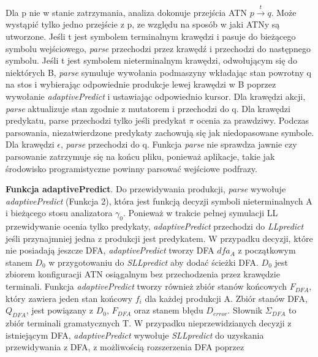 \par
Dla p nie w stanie zatrzymania, analiza dokonuje przejścia ATN $p\overset{t}{\rightarrow}q$.
Może wystąpić tylko jedno przejście z p, ze względu na sposób w jaki ATNy są utworzone.
Jeśli t jest symbolem terminalnym krawędzi i pasuje do bieżącego symbolu wejściowego,
\textit{parse} przechodzi przez krawędź i przechodzi do następnego symbolu.
Jeśli t jest symbolem nieterminalnym krawędzi, odwołującym się do niektórych B, \textit{parse} symuluje
wywołania podmaszyny wkładając stan powrotny q na stos i wybierając odpowiednie produkcje lewej krawędzi w B
poprzez wywołanie \textit{adaptivePredict} i ustawiając odpowiednio kursor.
Dla krawędzi akcji, \textit{parse} aktualizuje stan zgodnie z mutatorem i przechodzi do q.
Dla krawędzi predykatu, parse przechodzi tylko jeśli predykat $\pi$ ocenia za prawdziwy.
Podczas parsowania, niezatwierdzone predykaty zachowują się jak niedopasowane symbole.
Dla krawędzi $\epsilon$, \textit{parse} przechodzi do q.
Funkcja \textit{parse} nie sprawdza jawnie czy parsowanie zatrzymuje się na końcu pliku,
ponieważ aplikacje, takie jak środowisko programistyczne powinny parsować wejściowe podfrazy.
\par
\textbf{Funkcja adaptivePredict}. Do przewidywania produkcji, \textit{parse} wywołuje \textit{adaptivePredict}
(Funkcja 2), która jest funkcją decyzji symboli nieterminalnych A i bieżącego stosu analizatora $\gamma_0$.
Ponieważ w trakcie pełnej symulacji LL przewidywanie ocenia tylko predykaty, \textit{adaptivePredict}
przechodzi do \textit{LLpredict} jeśli przynajmniej jedna z produkcji jest predykatem.\footnotemark[5]
W przypadku decyzji, które nie posiadają jeszcze DFA, \textit{adaptivePredict} tworzy DFA $dfa_A$
z początkowym stanem $D_0$ w przygotowaniu do \textit{SLLpredict} aby dodać ścieżki DFA.
$D_0$ jest zbiorem konfiguracji ATN osiągalnym bez przechodzenia przez krawędzie terminali.
Funkcja \textit{adaptivePredict} tworzy również zbiór stanów końcowych $F_{DFA}$,
który zawiera jeden stan końcowy $f_i$ dla każdej produkcji A. Zbiór stanów DFA, $Q_{DFA}$,
jest powiązany z $D_0$, $F_{DFA}$ oraz stanem błędu $D_{error}$.
Słownik $\Sigma_{DFA}$ to zbiór terminali gramatycznych T.
W przypadku nieprzewidzianych decyzji z istniejącym DFA, \textit{adaptivePredict} wywołuje
\textit{SLLpredict} do uzyskania przewidywania z DFA, z możliwością rozszerzenia DFA poprzez
